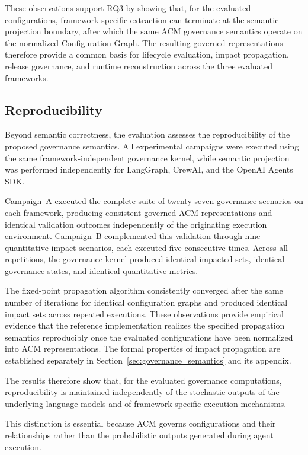 \documentclass[10pt]{article}
\begin{document}
These observations support RQ3 by showing that, for the evaluated
configurations, framework-specific extraction can terminate at the semantic projection boundary, after which the same ACM governance semantics operate on the normalized Configuration Graph. The resulting governed representations therefore provide a common basis for lifecycle evaluation, impact propagation, release governance, and runtime reconstruction across the three evaluated frameworks.

\subsection{Reproducibility}
\label{subsec:eval-reproducibility}

Beyond semantic correctness, the evaluation assesses the reproducibility of the proposed governance semantics. All experimental campaigns were executed using the same framework-independent governance kernel, while semantic projection was performed independently for LangGraph, CrewAI, and the OpenAI Agents SDK.

Campaign~A executed the complete suite of twenty-seven governance scenarios on each framework, producing consistent governed ACM representations and identical validation outcomes independently of the originating execution environment. Campaign~B complemented this validation through nine quantitative impact scenarios, each executed five consecutive times. Across all repetitions, the governance kernel produced identical impacted sets, identical governance states, and identical quantitative metrics.

The fixed-point propagation algorithm consistently converged after the same number of iterations for identical configuration graphs and produced identical impact sets across repeated executions. These observations provide empirical evidence that the reference implementation realizes the specified propagation semantics reproducibly once the evaluated configurations have been normalized into ACM representations. The formal properties of impact propagation are established separately in Section~\ref{sec:governance_semantics} and its appendix.

The results therefore show that, for the evaluated governance computations, reproducibility is maintained independently of the stochastic outputs of the underlying language models and of framework-specific execution mechanisms.

This distinction is essential because ACM governs configurations and their relationships rather than the probabilistic outputs generated during agent execution.
\end{document}
